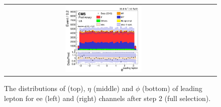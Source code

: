 \begin{figure}[ht]
\begin{center}
\begin{tabular}{ccc}
      \includegraphics[width=0.4\textwidth]{figures/tW/fig/Step2/mumu/H_lepton_led_phi.png}\\
    \end{tabular}
    \caption{The distributions of \pt (top), $\eta$ (middle) and $\phi$ (bottom) of leading lepton for ee (left) and \mumu (right) channels after step 2 (full selection).
    \label{fig:step2_leading_lepton}}
  \end{center}
\end{figure}

